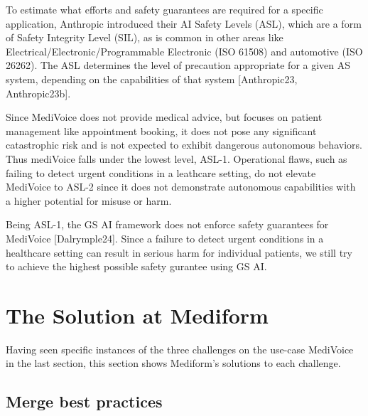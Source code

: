 \documentclass[twocolumn]{article}
\begin{document}
To estimate what efforts and safety guarantees are required for a specific application, 
Anthropic introduced their AI Safety Levels (ASL), which are a form of Safety Integrity Level (SIL),
as is common in other areas like Electrical/Electronic/Programmable Electronic (ISO 61508) and automotive (ISO 26262).
The ASL determines the level of precaution appropriate for a given AS system, depending on the capabilities of that system
[Anthropic23, Anthropic23b].

Since MediVoice does not provide medical advice, but focuses on patient management like appointment booking,
it does not pose any significant catastrophic risk and is not expected to exhibit dangerous autonomous behaviors.
Thus mediVoice falls under the lowest level, ASL-1.
Operational flaws, such as failing to detect urgent conditions in a leathcare setting,
do not elevate MediVoice to ASL-2 since it does not demonstrate autonomous capabilities with a higher potential for misuse or harm.

Being ASL-1, the GS AI framework does not enforce safety guarantees for MediVoice [Dalrymple24].
Since a failure to detect urgent conditions in a healthcare setting can result in serious harm for individual patients,
we still try to achieve the highest possible safety gurantee using GS AI.


\section{The Solution at Mediform}

Having seen specific instances of the three challenges on the use-case MediVoice in the last section, this section shows Mediform’s solutions to each challenge.

\subsection{Merge best practices}
\end{document}
